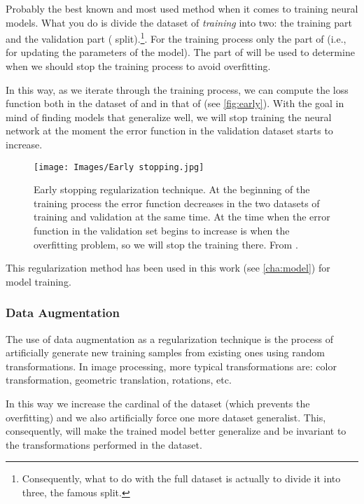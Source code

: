 Probably the best known and most used method when it comes to training neural
models. What you do is divide the dataset of \emph{training} into two: the
training part and the validation part (
split).\footnote{Consequently, what to do with the full dataset is actually to
  divide it into three, the famous  split.}. For the
training process only the part of  (i.e., for updating the
parameters of the model). The part of  will be used to determine when
we should stop the training process to avoid overfitting.

In this way, as we iterate through the training process, we can compute the
loss function both in the dataset of  and in that of 
(see \vref{fig:early}). With the goal in mind of finding models that generalize
well, we will stop training the neural network at the moment the error function
in the validation dataset starts to increase.

\begin{figure}[ht]
  \centering
  \texttt{[image: Images/Early stopping.jpg]}
  \caption[Early stopping regularization technique]{Early stopping
    regularization technique. At the beginning of the training process the
    error function decreases in the two datasets of training and validation at
    the same time. At the time when the error function in the validation set
    begins to increase is when the overfitting problem, so we will stop the
    training there. From
    .}\label{fig:early}
\end{figure}

This regularization method has been used in this work (see \vref{cha:model})
for model training.

\subsubsection{Data Augmentation}

The use of data augmentation as a regularization technique is the process of
artificially generate new training samples from existing ones using random
transformations. In image processing, more typical transformations are: color
transformation, geometric translation, rotations, etc.

In this way we increase the cardinal of the dataset (which prevents the
overfitting) and we also artificially force one more dataset generalist. This,
consequently, will make the trained model better generalize and be invariant to
the transformations performed in the dataset.

